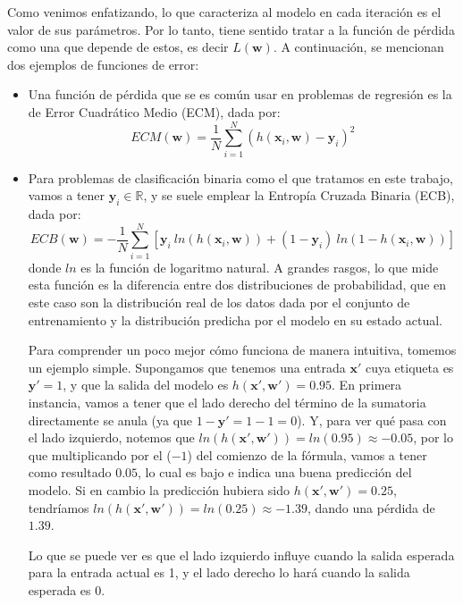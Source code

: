 \documentclass[../../main.tex]{subfiles}
\begin{document}
Como venimos enfatizando, lo que caracteriza al modelo en cada iteración es el valor de
sus parámetros. Por lo tanto, tiene sentido tratar a la función de pérdida como una que
depende de estos, es decir \(L(\bm{w})\)\footnotemark.  A continuación, se mencionan dos ejemplos de funciones de error:
\begin{itemize}
    \item Una función de pérdida que se es común usar en problemas de regresión es la de
    Error Cuadrático Medio (ECM), dada por:
    \[
    ECM(\bm{w}) = \frac{1}{N} \sum_{i=1}^{N} \left(h(\bm{x}_i, \bm{w}) - \bm{y}_i\right)^2
    \]
    \item Para problemas de clasificación binaria como el que tratamos en este trabajo, vamos a tener
    \(\bm{y}_i \in \mathbb{R}\), y se suele emplear la Entropía Cruzada Binaria (ECB), dada por:
    \[
    ECB(\bm{w}) = -\frac{1}{N} \sum_{i=1}^{N}
        \left[
            \bm{y}_i\ ln(h(\bm{x}_i, \bm{w})) + (1 - \bm{y}_i)\ ln(1 - h(\bm{x}_i, \bm{w}))
        \right]
    \]
    donde \(ln\) es la función de logaritmo natural. A grandes rasgos, lo que mide esta
    función es la diferencia entre dos distribuciones de probabilidad, que en este caso
    son la distribución real de los datos dada por el conjunto de entrenamiento y la
    distribución predicha por el modelo en su estado actual.

    Para comprender un poco mejor cómo funciona de manera intuitiva, tomemos un ejemplo
    simple. Supongamos que tenemos una entrada \(\bm{x}'\) cuya etiqueta es \(\bm{y}'=1\),
    y que la salida del modelo es \(h(\bm{x}', \bm{w}') = 0{.}95\). En primera instancia,
    vamos a tener que el lado derecho del término de la sumatoria directamente se anula
    (ya que \(1-\bm{y}' = 1-1 = 0\)). Y, para ver qué pasa con el lado izquierdo, notemos
    que \(ln(h(\bm{x}', \bm{w}')) = ln(0{.}95) \approx -0{.}05\), por lo que multiplicando
    por el (\(-1\)) del comienzo de la fórmula, vamos a tener como resultado \(0{.}05\),
    lo cual es bajo e indica una buena predicción del modelo. Si en cambio la predicción
    hubiera sido \(h(\bm{x}', \bm{w}') = 0{.}25\), tendríamos \(ln(h(\bm{x}', \bm{w}')) =
    ln(0{.}25) \approx -1{.}39\), dando una pérdida de \(1{.}39\).

    Lo que se puede ver es que el lado izquierdo influye cuando la salida esperada para la
    entrada actual es 1, y el lado derecho lo hará cuando la salida esperada es 0.
\end{itemize}
\end{document}
